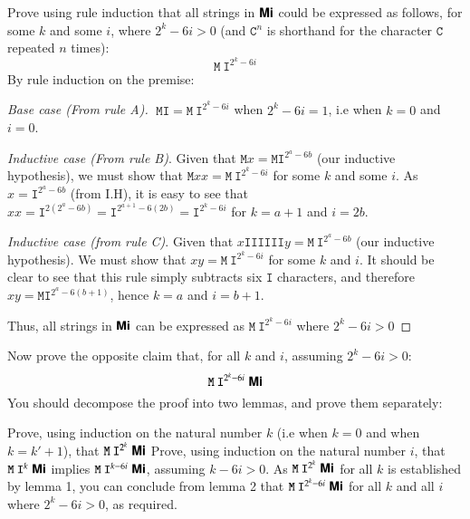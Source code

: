 \documentclass{book}
\begin{document}
\begin{ExerciseList}
      \Exercise Prove using rule induction that all strings in $\textsf{\textbf{Mi}}$ could be expressed as follows, for some $k$ and some $i$, where $2^k - 6i > 0$ (and $\mathtt{C}^n$ is shorthand for the character $\mathtt{C}$ repeated $n$ times):
      \begin{displaymath}
        \mathtt{M}\:\mathtt{I}^{2^k - 6i}
      \end{displaymath}
      \Answer By rule induction on the premise:

        \begin{proof}[Base case (From rule A)] $\;\mathtt{MI} = \mathtt{M\:I}^{2^k - 6i}$ when $2^k - 6i = 1$, i.e when $k = 0$ and $i = 0$.
          
          \medskip
          
          \emph{Inductive case (From rule B)}. Given that $\mathtt{M} x = \mathtt{MI}^{2^a - 6b}$ (our inductive hypothesis), we must show that $\mathtt{M} x x = \mathtt{M\:I}^{2^k - 6i}$ for some $k$ and some $i$. As $x = \mathtt{I}^{2^a - 6b}$ (from I.H), it is easy to see that $x x = \mathtt{I}^{2 (2^a - 6b)} = \mathtt{I}^{2^{a + 1} - 6(2b)} = \mathtt{I}^{2^k - 6i}$ for $k = a + 1$ and $i = 2b$.
          
          \medskip
          
          \emph{Inductive case (from rule C)}. Given that $x \mathtt{IIIIII} y = \mathtt{M\:I}^{2^a - 6b}$ (our inductive hypothesis). We must show that $x y = \mathtt{M\:I}^{2^k - 6i}$ for some $k$ and $i$. It should be clear to see that this rule simply subtracts six $\mathtt{I}$ characters, and therefore $x y = \mathtt{MI}^{2^a - 6(b + 1)}$, hence $k = a$ and $i = b + 1$.
          
          \bigskip
          
          Thus, all strings in $\textsf{\textbf{Mi}}$ can be expressed as $\mathtt{M\:I}^{2^k - 6i}$ where $2^k - 6i > 0$
        \end{proof}

      \Exercise Now prove the opposite claim that, for all $k$ and $i$, assuming $2^k - 6i > 0$:
      \begin{displaymath}
        {\mathtt{M}\:\mathtt{I}^{2^k - 6i}}\;\textsf{\textbf{\textsf{\textbf{Mi}}}}
      \end{displaymath}
      You should decompose the proof into two lemmas, and prove them separately:
      
        \Question Prove, using induction on the natural number $k$ (i.e when $k = 0$ and when $k = k' + 1$), that ${\mathtt{M}\:\mathtt{I}^{2^k}}\;\textsf{\textbf{\textsf{\textbf{Mi}}}}$
        \Question Prove, using induction on the natural number $i$, that ${\mathtt{M}\:\mathtt{I}^{k}}\;\textsf{\textbf{\textsf{\textbf{Mi}}}}$ implies ${\mathtt{M}\:\mathtt{I}^{k - 6i}}\;\textsf{\textbf{\textsf{\textbf{Mi}}}}$, assuming $k - 6i > 0$.
        \ExeText
        As ${\mathtt{M\:I}^{2^k}}\;\textsf{\textbf{\textsf{\textbf{Mi}}}}$ for all $k$ is established by lemma 1, you can conclude from lemma 2 that ${\mathtt{M\:I}^{2^k - 6i}}\;\textsf{\textbf{\textsf{\textbf{Mi}}}}$ for all $k$ and all $i$ where $2^k - 6i > 0$, as required.


\end{ExerciseList}
\end{document}
